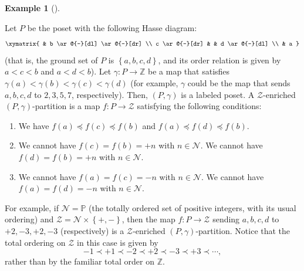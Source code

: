 \documentclass[numbers=enddot,12pt,final,onecolumn,notitlepage]{scrartcl}%
\makeatletter
\theoremstyle{definition}
\newtheorem{exmp}[theo]{Example}
\newenvironment{example}[1][]
{\begin{exmp}[#1]\begin{leftbar}}
{\end{leftbar}\end{exmp}}
\newcommand{\are}{\ar@{-}}
\makeatother
\begin{document}
\begin{example}
\label{exa.ambivPp.diamond}Let $P$ be the poset with the following Hasse
diagram:%
\[%
\xymatrix{
& b \are[dl] \are[dr] \\
c \are[dr] & & d \are[dl] \\
& a
}%
\]
(that is, the ground set of $P$ is $\left\{ a, b, c, d \right\}$, and
its order relation is given by $a < c < b$ and $a < d < b$).
Let $\gamma:P\rightarrow\mathbb{Z}$ be a map that satisfies
$\gamma\left(  a\right)  <\gamma\left(  b\right)  <\gamma\left(  c\right)
<\gamma\left(  d\right)  $ (for example, $\gamma$ could be the map that sends
$a,b,c,d$ to $2,3,5,7$, respectively).
Then, $\left(P, \gamma\right)$ is a labeled poset.
A $\mathcal{Z}$-enriched $\left(
P,\gamma\right)  $-partition is a map $f:P\rightarrow\mathcal{Z}$ satisfying
the following conditions:

\begin{enumerate}
\item[\textbf{(i)}] We have $f\left(  a\right)  \preccurlyeq f\left(
c\right)  \preccurlyeq f\left(  b\right)  $ and $f\left(  a\right)
\preccurlyeq f\left(  d\right)  \preccurlyeq f\left(  b\right)  $.

\item[\textbf{(ii)}] We cannot have $f\left(  c\right)  =f\left(  b\right)
=+n$ with $n\in\mathcal{N}$. \newline
We cannot have $f\left(  d\right)
=f\left(  b\right)  =+n$ with $n\in\mathcal{N}$.

\item[\textbf{(iii)}] We cannot have $f\left(  a\right)  =f\left(  c\right)
=-n$ with $n\in\mathcal{N}$. \newline
We cannot have $f\left(  a\right)
=f\left(  d\right)  =-n$ with $n\in\mathcal{N}$.
\end{enumerate}

For example, if $\mathcal{N}=\mathbb{P}$ (the totally ordered set of positive
integers, with its usual ordering) and $\mathcal{Z}=\mathcal{N}\times\left\{
+,-\right\}  $, then the map $f:P\rightarrow\mathcal{Z}$ sending $a,b,c,d$ to
$+2,-3,+2,-3$ (respectively) is a $\mathcal{Z}$-enriched $\left(
P,\gamma\right)  $-partition. Notice that the total ordering on $\mathcal{Z}$
in this case is given by%
\[
-1\prec+1\prec-2\prec+2\prec-3\prec+3\prec\cdots,
\]
rather than by the familiar total order on $\mathbb{Z}$.
\end{example}
\end{document}
